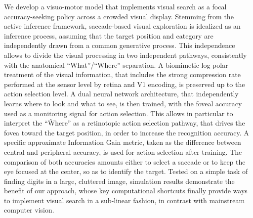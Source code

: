 

We develop a visuo-motor model that implements visual search as a focal accuracy-seeking policy across a crowded visual display.
Stemming from the active inference framework, saccade-based visual exploration is idealized as an inference process, assuming that the target position and category are independently drawn from a common generative process. 
This independence allows to divide the visual processing in two independent pathways, consistently with the anatomical ``What''/``Where'' separation. 
A biomimetic log-polar treatment of the visual information, that includes the strong compression rate performed at the sensor level by retina and V1 encoding,  
is preserved up to the action selection level.
A dual neural network architecture, that independently learns where to look and what to see, is then trained, 
with the foveal accuracy used as a monitoring signal for action selection.
This allows in particular to interpret the ``Ẁhere'' as a retinotopic action selection pathway, that drives the fovea toward the target position, in order to increase the recognition accuracy.
A specific approximate Information Gain metric, taken as the difference between central and peripheral accuracy, is used for action selection after training.
The comparison of both accuracies amounts either to select a saccade or to keep the eye focused at the center, so as to identify the target.
Tested on a simple task of finding digits in a large, cluttered image, simulation results demonstrate the benefit of our approach, whose key computational shortcuts finally provide ways to implement visual search in a sub-linear fashion, in contrast with mainstream computer vision. 


